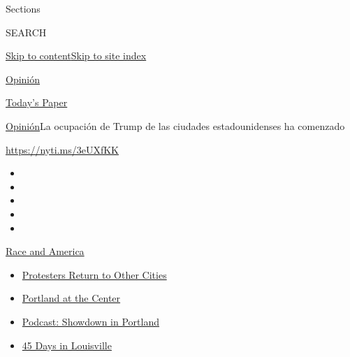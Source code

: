 Sections

SEARCH

\protect\hyperlink{site-content}{Skip to
content}\protect\hyperlink{site-index}{Skip to site index}

\href{https://www.nytimes3xbfgragh.onion/es/section/opinion}{Opinión}

\href{https://myaccount.nytimes3xbfgragh.onion/auth/login?response_type=cookie\&client_id=vi}{}

\href{https://www.nytimes3xbfgragh.onion/section/todayspaper}{Today's
Paper}

\href{/es/section/opinion}{Opinión}\textbar{}La ocupación de Trump de
las ciudades estadounidenses ha comenzado

\url{https://nyti.ms/3eUXfKK}

\begin{itemize}
\item
\item
\item
\item
\item
\end{itemize}

\href{https://www.nytimes3xbfgragh.onion/news-event/george-floyd-protests-minneapolis-new-york-los-angeles?action=click\&pgtype=Article\&state=default\&region=TOP_BANNER\&context=storylines_menu}{Race
and America}

\begin{itemize}
\tightlist
\item
  \href{https://www.nytimes3xbfgragh.onion/2020/07/26/us/protests-portland-seattle-trump.html?action=click\&pgtype=Article\&state=default\&region=TOP_BANNER\&context=storylines_menu}{Protesters
  Return to Other Cities}
\item
  \href{https://www.nytimes3xbfgragh.onion/2020/07/24/us/portland-oregon-protests-white-race.html?action=click\&pgtype=Article\&state=default\&region=TOP_BANNER\&context=storylines_menu}{Portland
  at the Center}
\item
  \href{https://www.nytimes3xbfgragh.onion/2020/07/23/podcasts/the-daily/portland-protests.html?action=click\&pgtype=Article\&state=default\&region=TOP_BANNER\&context=storylines_menu}{Podcast:
  Showdown in Portland}
\item
  \href{https://www.nytimes3xbfgragh.onion/interactive/2020/07/16/us/black-lives-matter-protests-louisville-breonna-taylor.html?action=click\&pgtype=Article\&state=default\&region=TOP_BANNER\&context=storylines_menu}{45
  Days in Louisville}
\end{itemize}

